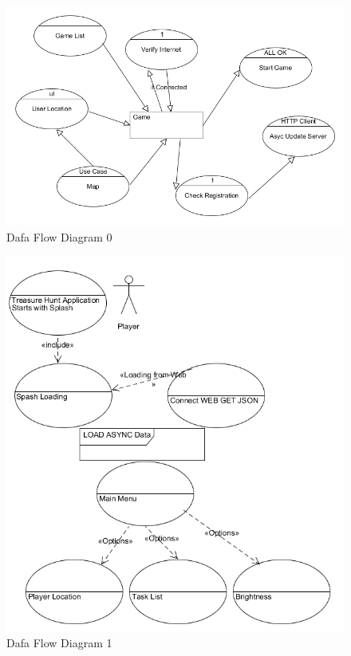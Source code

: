 \begin{figure}[ht!]
\left
\includegraphics[width=150mm]{images/dfd0}
\caption{Dafa Flow Diagram 0}
\label{overflow}
\end{figure}
\newpage

\begin{figure}[ht!]
\left
\includegraphics[width=150mm]{dfd0}
\caption{Dafa Flow Diagram 1}
\label{overflow}
\end{figure}
\newpage


